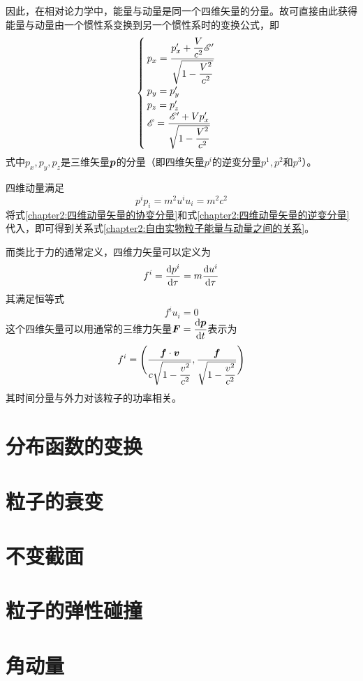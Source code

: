 因此，在相对论力学中，能量与动量是同一个四维矢量的分量。故可直接由此获得能量与动量由一个惯性系变换到另一个惯性系时的变换公式，即
\begin{equation}
\begin{cases}
	\displaystyle p_x = \frac{p'_x+\dfrac{V}{c^2}\mathscr{E}'}{\sqrt{1-\dfrac{V^2}{c^2}}} \\
	p_y = p'_y \\
	p_z = p'_z \\
	\displaystyle \mathscr{E} = \frac{\mathscr{E}'+Vp'_x}{\sqrt{1-\dfrac{V^2}{c^2}}}
\end{cases}
\label{chapter2:惯性系能量动量变换关系式}
\end{equation}
式中$p_x, p_y, p_z$是三维矢量$\boldsymbol{p}$的分量（即四维矢量$p^i$的逆变分量$p^1, p^2$和$p^3$）。

四维动量满足
\begin{equation}
	p^ip_i = m^2u^iu_i = m^2c^2
\end{equation}
将式\eqref{chapter2:四维动量矢量的协变分量}和式\eqref{chapter2:四维动量矢量的逆变分量}代入，即可得到关系式\eqref{chapter2:自由实物粒子能量与动量之间的关系}。

而类比于力的通常定义，四维力矢量可以定义为
\begin{equation}
	f^i = \frac{\mathrm{d} p^i}{\mathrm{d} \tau} = m\frac{\mathrm{d} u^i}{\mathrm{d} \tau}
	\label{chapter2:四维力矢量}
\end{equation}
其满足恒等式
\begin{equation}
	f^i u_i = 0
\end{equation}
这个四维矢量可以用通常的三维力矢量$\boldsymbol{F} = \dfrac{\mathrm{d} \boldsymbol{p}}{\mathrm{d} t}$表示为
\begin{equation}
	f^i = \Bigg(\frac{\boldsymbol{f}\cdot\boldsymbol{v}}{c\sqrt{1-\dfrac{v^2}{c^2}}}, \frac{\boldsymbol{f}}{\sqrt{1-\dfrac{v^2}{c^2}}}\Bigg)
\end{equation}
其时间分量与外力对该粒子的功率相关。

\section{分布函数的变换}

\section{粒子的衰变}

\section{不变截面}

\section{粒子的弹性碰撞}

\section{角动量}

